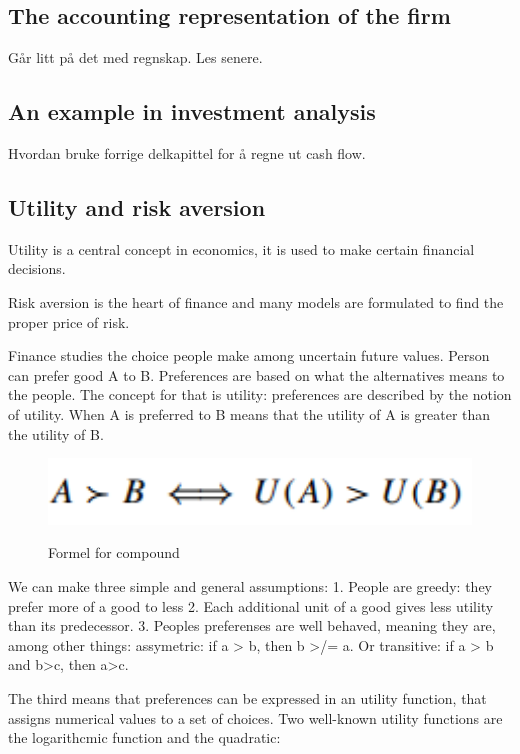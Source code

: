 \subsection{The accounting representation of the firm}
Går litt på det med regnskap. Les senere.

\subsection{An example in investment analysis}
Hvordan bruke forrige delkapittel for å regne ut cash flow.

\subsection{Utility and risk aversion}
Utility is a central concept in economics, it is used to make certain financial decisions.

Risk aversion is the heart of finance and many models are formulated to find the proper price of risk.

Finance studies the choice people make among uncertain future values. Person can prefer good A to B. Preferences are based on what the alternatives means to the people. The concept for that is utility: preferences are described by the notion of utility. When A is preferred to B means that the utility of A is greater than the utility of B.

\begin{figure}[ht!]
\centering
\includegraphics[width=120mm]{figures/formel1-12.png}
\label{fig:formel1-12}
\caption{Formel for compound}
\end{figure}

We can make three simple and general assumptions:
1. People are greedy: they prefer more of a good to less
2. Each additional unit of a good gives less utility than its predecessor.
3. Peoples preferenses are well behaved, meaning they are, among other things: assymetric: if a > b, then b >/= a. Or transitive: if a > b and b>c, then a>c.

The third means that preferences can be expressed in an utility function, that assigns numerical values to a set of choices. Two well-known utility functions are the logarithcmic function and the quadratic: 

